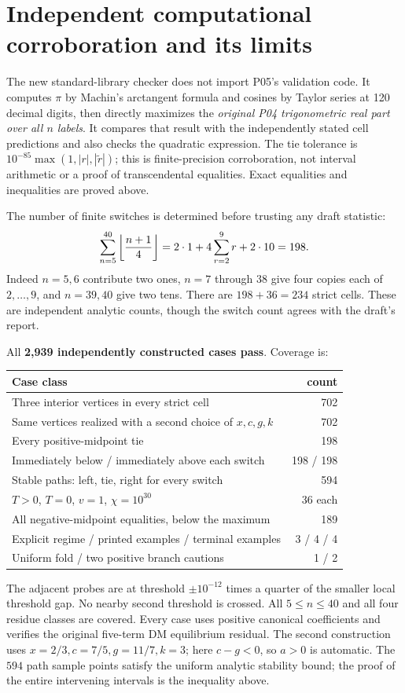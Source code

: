 \documentclass[11pt]{article}
\begin{document}
\section{Independent computational corroboration and its limits}
The new standard-library checker
 does not import P05's validation
code. It computes $\pi$ by Machin's arctangent formula and cosines by
Taylor series at 120 decimal digits, then directly maximizes the
\emph{original P04 trigonometric real part over all $n$ labels}.
It compares that result with the independently stated cell predictions
and also checks the quadratic expression. The tie tolerance is
$10^{-85}\max(1,|r|,|\widetilde r|)$; this is finite-precision
corroboration, not interval arithmetic or a proof of transcendental
equalities. Exact equalities and inequalities are proved above.

The number of finite switches is determined before trusting any draft
statistic:
\[
 \sum_{n=5}^{40}\left\lfloor{n+1\over4}\right\rfloor
 =2\cdot1+4\sum_{r=2}^{9}r+2\cdot10=198.
\]
Indeed $n=5,6$ contribute two ones, $n=7$ through $38$ give four
copies each of $2,\ldots,9$, and $n=39,40$ give two tens.
There are $198+36=234$ strict cells. These are independent analytic
counts, though the switch count agrees with the draft's report.

All \textbf{2,939 independently constructed cases pass}. Coverage is:
\begin{center}
\begin{tabular}{@{}l r@{}}
\toprule Case class&count\\\midrule
Three interior vertices in every strict cell&702\\
Same vertices realized with a second choice of $x,c,g,k$&702\\
Every positive-midpoint tie&198\\
Immediately below / immediately above each switch&198 / 198\\
Stable paths: left, tie, right for every switch&594\\
$T>0$, $T=0$, $v=1$, $\chi=10^{30}$&36 each\\
All negative-midpoint equalities, below the maximum&189\\
Explicit regime / printed examples / terminal examples&3 / 4 / 4\\
Uniform fold / two positive branch cautions&1 / 2\\\bottomrule
\end{tabular}
\end{center}
The adjacent probes are at threshold $\pm10^{-12}$ times a quarter
of the smaller local threshold gap. No nearby second threshold is crossed.
All $5\le n\le40$ and all four residue classes are covered. Every case
uses positive canonical coefficients and verifies the original five-term
DM equilibrium residual. The second construction uses
$x=2/3,c=7/5,g=11/7,k=3$; here $c-g<0$, so $a>0$ is automatic.
The $594$ path sample points satisfy the uniform analytic stability bound;
the proof of the entire intervening intervals is the inequality above.
\end{document}
